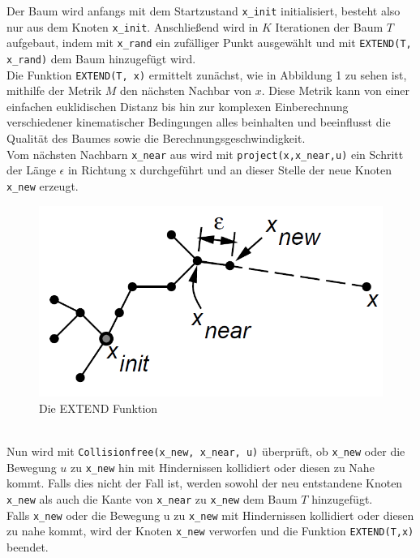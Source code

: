 Der Baum wird anfangs mit dem Startzustand \verb|x_init| initialisiert, besteht also nur aus dem Knoten \verb|x_init|. Anschließend wird in $K$ Iterationen der Baum $T$ aufgebaut, indem mit \verb|x_rand| ein zufälliger Punkt ausgewählt und mit \verb|EXTEND(T, x_rand)| dem Baum hinzugefügt wird. \\

Die Funktion \verb|EXTEND(T, x)| ermittelt zunächst, wie in Abbildung 1 zu sehen ist, mithilfe der Metrik $M$ den nächsten Nachbar von $x$. Diese Metrik kann von einer einfachen euklidischen Distanz bis hin zur komplexen Einberechnung verschiedener kinematischer Bedingungen alles beinhalten und beeinflusst die Qualität des Baumes sowie die Berechnungsgeschwindigkeit. \\
Vom nächsten Nachbarn \verb|x_near| aus wird mit \verb|project(x,x_near,u)| ein Schritt der Länge  $\epsilon$ in Richtung x durchgeführt und an dieser Stelle der neue Knoten \verb|x_new| erzeugt. 
\begin{figure}
\centering
\includegraphics[scale=0.5]{Bilder/Extend.png} 
\caption{Die EXTEND Funktion \citep{Lav00} }
\end{figure} \\
Nun wird mit \verb|Collisionfree(x_new, x_near, u)| überprüft, ob \verb|x_new| oder die Bewegung $u$ zu \verb|x_new| hin mit Hindernissen kollidiert oder diesen zu Nahe kommt. Falls dies nicht der Fall ist, werden sowohl der neu entstandene Knoten \verb|x_new| als auch die Kante von \verb|x_near| zu \verb|x_new| dem Baum $T$ hinzugefügt. \\
Falls  \verb|x_new| oder die Bewegung u zu  \verb|x_new| mit Hindernissen kollidiert oder diesen zu nahe kommt, wird der Knoten  \verb|x_new| verworfen und die Funktion \verb|EXTEND(T,x)| beendet.\\

